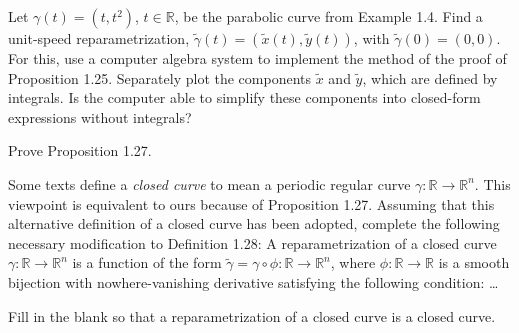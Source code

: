 \begin{exercise}{1.32}
	Let $\gamma(t) = (t, t^{2})$, $t\in \mathbb{R}$, be the parabolic curve from Example 1.4. Find a unit-speed reparametrization, $\tilde{\gamma}(t) = (\tilde{x}(t), \tilde{y}(t))$, with $\tilde{\gamma}(0) = (0, 0)$. For this, use a computer algebra system to implement the method of the proof of Proposition 1.25.  Separately plot the components $\tilde{x}$ and $\tilde{y}$, which are defined by integrals. Is the computer able to simplify these components into closed-form expressions without integrals?
\end{exercise}

\begin{exercise}{1.33}
	Prove Proposition 1.27.
\end{exercise}

\begin{exercise}{1.34}
	Some texts define a \textit{closed curve} to mean a periodic regular curve $\gamma: \mathbb{R} \to \mathbb{R}^{n}$. This viewpoint is equivalent to ours because of Proposition 1.27. Assuming that this alternative definition of a closed curve has been adopted, complete the following necessary modification to Definition 1.28: A reparametrization of a closed curve $\gamma: \mathbb{R}\to \mathbb{R}^{n}$ is a function of the form $\tilde{\gamma} = \gamma\circ \phi: \mathbb{R} \to \mathbb{R}^{n}$, where $\phi: \mathbb{R} \to \mathbb{R}$ is a smooth bijection with nowhere-vanishing derivative satisfying the following condition: \ldots

	Fill in the blank so that a reparametrization of a closed curve is a closed curve.
\end{exercise}

